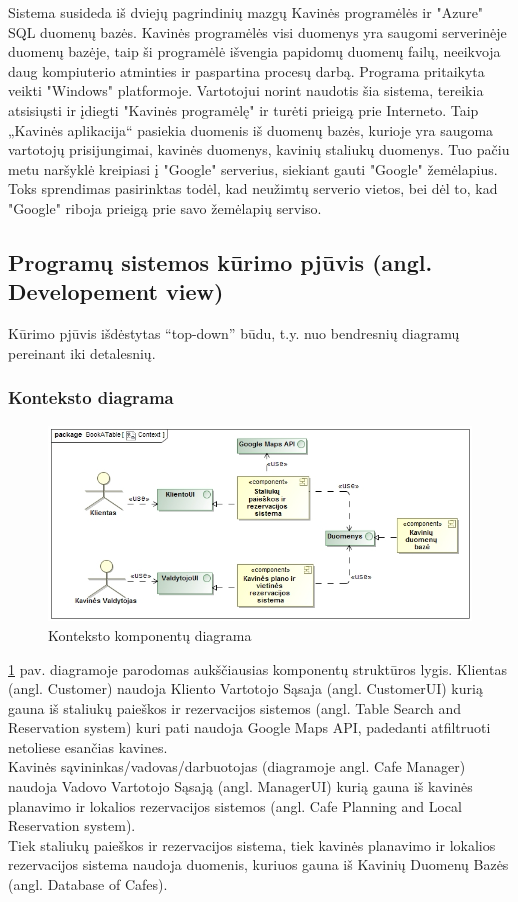 \documentclass{VUMIFPSkursinis}
\begin{document}
{{{{{Sistema susideda iš dviejų pagrindinių mazgų Kavinės programėlės ir "Azure" SQL duomenų bazės. Kavinės programėlės visi duomenys yra saugomi serverinėje duomenų bazėje, taip ši programėlė išvengia papidomų duomenų failų, neeikvoja daug kompiuterio atminties ir paspartina procesų darbą. Programa pritaikyta veikti "Windows" platformoje. Vartotojui norint naudotis šia sistema, tereikia atsisiųsti ir įdiegti "Kavinės programėlę" ir turėti prieigą prie Interneto. Taip „Kavinės aplikacija“ pasiekia duomenis iš duomenų bazės, kurioje yra saugoma vartotojų prisijungimai, kavinės duomenys, kavinių staliukų duomenys. Tuo pačiu metu naršyklė kreipiasi į "Google" serverius, siekiant gauti "Google" žemėlapius. Toks sprendimas pasirinktas todėl, kad neužimtų serverio vietos, bei dėl to, kad "Google" riboja prieigą prie savo žemėlapių serviso. 




\subsection {Programų sistemos kūrimo pjūvis (angl. Developement view)}
Kūrimo pjūvis išdėstytas “top-down” būdu, t.y. nuo bendresnių
diagramų pereinant iki detalesnių.

\subsubsection{Konteksto diagrama}

\begin {figure}[H]
	\includegraphics[width=\textwidth,height=\textheight,keepaspectratio]{img/Context}
	\caption{Konteksto komponentų diagrama}
	\label{fig:Context}
\end{figure}

\ref {fig:Context} pav. diagramoje parodomas aukščiausias komponentų struktūros lygis. Klientas (angl. Customer) naudoja Kliento Vartotojo Sąsaja (angl. CustomerUI) kurią gauna iš staliukų paieškos ir rezervacijos sistemos (angl. Table Search and Reservation system) kuri pati naudoja Google Maps API, padedanti atfiltruoti netoliese esančias kavines. \\
Kavinės sąvininkas/vadovas/darbuotojas (diagramoje angl. Cafe Manager) naudoja Vadovo Vartotojo Sąsają (angl. ManagerUI) kurią gauna iš kavinės planavimo ir lokalios rezervacijos sistemos (angl. Cafe Planning and Local Reservation system).\\
Tiek staliukų paieškos ir rezervacijos sistema, tiek kavinės planavimo ir lokalios rezervacijos sistema naudoja duomenis, kuriuos gauna iš Kavinių Duomenų Bazės (angl. Database of Cafes).


}}}}}
\end{document}
